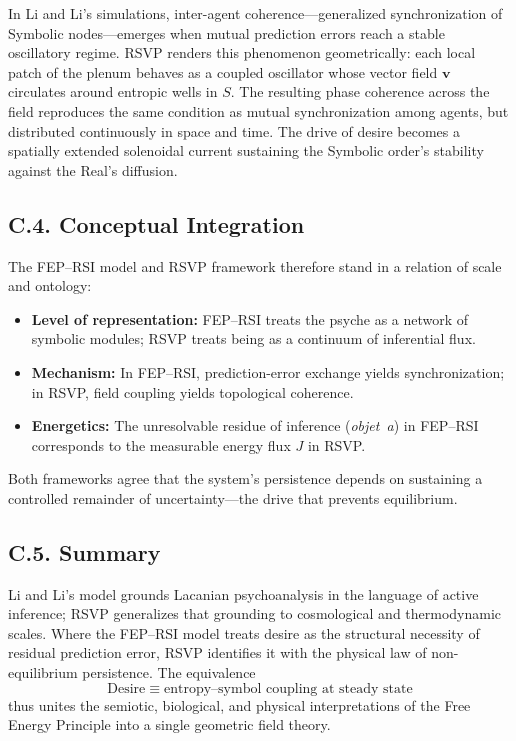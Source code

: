 \documentclass[12pt,a4paper]{article}
\begin{document}
In Li and Li’s simulations, inter-agent coherence—generalized synchronization of Symbolic nodes—emerges when mutual prediction errors reach a stable oscillatory regime.  
RSVP renders this phenomenon geometrically: each local patch of the plenum behaves as a coupled oscillator whose vector field $\mathbf{v}$ circulates around entropic wells in $S$.  
The resulting phase coherence across the field reproduces the same condition as mutual synchronization among agents, but distributed continuously in space and time.  
The drive of desire becomes a spatially extended solenoidal current sustaining the Symbolic order’s stability against the Real’s diffusion.

\subsection*{C.4. Conceptual Integration}

The FEP–RSI model and RSVP framework therefore stand in a relation of scale and ontology:
\begin{itemize}[leftmargin=1.4em]
  \item \textbf{Level of representation:} FEP–RSI treats the psyche as a network of symbolic modules; RSVP treats being as a continuum of inferential flux.
  \item \textbf{Mechanism:} In FEP–RSI, prediction-error exchange yields synchronization; in RSVP, field coupling yields topological coherence.
  \item \textbf{Energetics:} The unresolvable residue of inference (\emph{objet~a}) in FEP–RSI corresponds to the measurable energy flux $J$ in RSVP.
\end{itemize}
Both frameworks agree that the system’s persistence depends on sustaining a controlled remainder of uncertainty—the drive that prevents equilibrium.

\subsection*{C.5. Summary}

Li and Li’s model grounds Lacanian psychoanalysis in the language of active inference; RSVP generalizes that grounding to cosmological and thermodynamic scales.  
Where the FEP–RSI model treats desire as the structural necessity of residual prediction error, RSVP identifies it with the physical law of non-equilibrium persistence.  
The equivalence
\[
\boxed{\text{Desire} \;\equiv\; \text{entropy–symbol coupling at steady state}}
\]
thus unites the semiotic, biological, and physical interpretations of the Free Energy Principle into a single geometric field theory.
\end{document}
